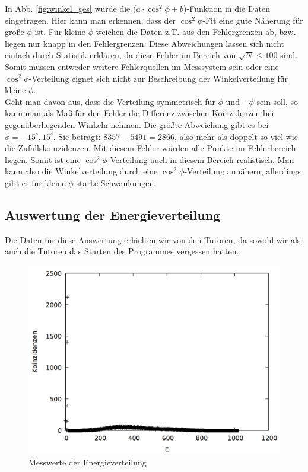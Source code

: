 In Abb. \ref{fig:winkel_ges} wurde die ($a \cdot \cos^2{\phi} + b$)-Funktion in die Daten eingetragen. Hier kann man erkennen, dass der  $\cos^2{\phi}$-Fit eine gute Näherung für große $\phi$ ist. Für kleine $\phi$ weichen die Daten z.T. aus den Fehlergrenzen ab, bzw. liegen nur knapp in den Fehlergrenzen. Diese Abweichungen lassen sich nicht einfach durch Statistik erklären, da diese Fehler im Bereich von $\sqrt{N} \leq 100$ sind. Somit müssen entweder weitere Fehlerquellen im Messsystem sein oder eine $\cos^2{\phi}$-Verteilung eignet sich nicht zur Beschreibung der Winkelverteilung für kleine $\phi$.\\

Geht man davon aus, dass die Verteilung symmetrisch für $\phi$ und $-\phi$ sein soll, so kann man als Maß für den Fehler die Differenz zwischen Koinzidenzen bei gegenüberliegenden Winkeln nehmen. Die größte Abweichung gibt es bei $\phi = -15^\circ,15^\circ$. Sie beträgt: $8357
 - 5491 = 2866$, also mehr als doppelt so viel wie die Zufallskoinzidenzen. Mit diesem Fehler würden alle Punkte im Fehlerbereich liegen. Somit ist eine $\cos^2{\phi}$-Verteilung auch in diesem Bereich realistisch. Man kann also die Winkelverteilung durch eine $\cos^2{\phi}$-Verteilung annähern, allerdings gibt es für kleine $\phi$ starke Schwankungen.
 
\subsection{Auswertung der Energieverteilung}

Die Daten für diese Auswertung erhielten wir von den Tutoren, da sowohl wir als auch die Tutoren das Starten des Programmes vergessen hatten.\\

\begin{figure}
\centering
\includegraphics[width=0.75\linewidth]{data/friedrich/mca_raw.png}
\caption{Messwerte der Energieverteilung}
\label{fig:mca_raw}
\end{figure}

